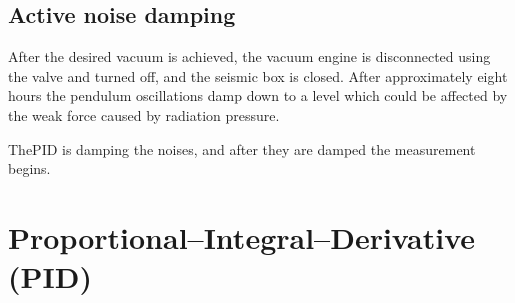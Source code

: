 \documentclass[\main/master.tex]{subfiles}
\begin{document}
\subsection{Active noise damping}
\par\noindent
After the desired vacuum is achieved, the vacuum engine is disconnected using the valve and turned off, and the seismic box is closed. After approximately eight hours the pendulum oscillations damp down to a level which could be affected by the weak force caused by radiation pressure.


\par\noindent
ThePID is damping the noises, and after they are damped the measurement begins.






















\section{Proportional–Integral–Derivative (PID)}
\end{document}
